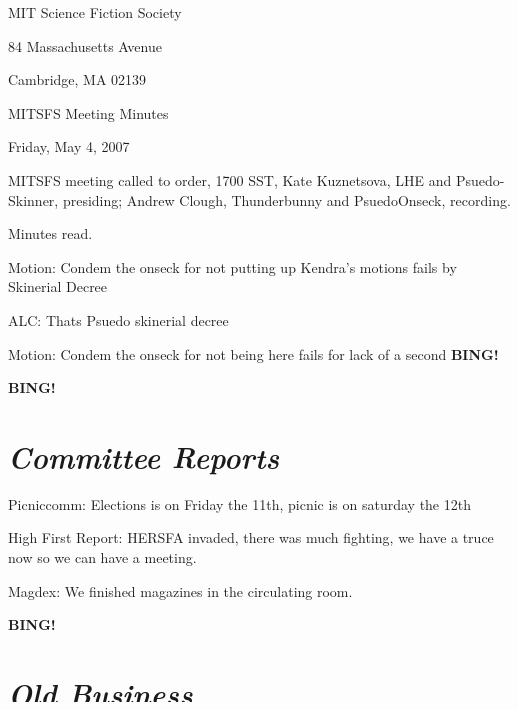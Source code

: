 \documentclass[10pt]{article}
\newcommand{\bing}{{\bf BING!} }
\newcommand{\goto}[1]{\bing \vskip 12pt \section*{{\em{#1}}}}
\begin{document}
\begin{center}

MIT Science Fiction Society

84 Massachusetts Avenue

Cambridge, MA 02139

\vspace{12pt}

MITSFS Meeting Minutes

Friday, May 4, 2007

\end{center}

\vspace{18pt}

\setlength{\parskip}{6pt}

\noindent
MITSFS meeting called to order, 1700 SST,
Kate Kuznetsova, LHE and Psuedo-Skinner, presiding; Andrew Clough, Thunderbunny and PsuedoOnseck, recording.

Minutes read.

Motion:  Condem the onseck for not putting up Kendra's motions fails by Skinerial Decree

ALC:  Thats Psuedo skinerial decree

Motion:  Condem the onseck for not being here fails for lack of a second \bing

\goto{Committee Reports}

Picniccomm:  Elections is on Friday the 11th, picnic is on saturday the 12th

High First Report:  HERSFA invaded, there was much fighting, we have a truce now so we can have a meeting.

Magdex:  We finished magazines in the circulating room.




\goto{Old Business}

Motion:  Condem the psuedo skinner for not haveing a resonant bing passes 20-0-1+Spehn much better \bing
\end{document}
